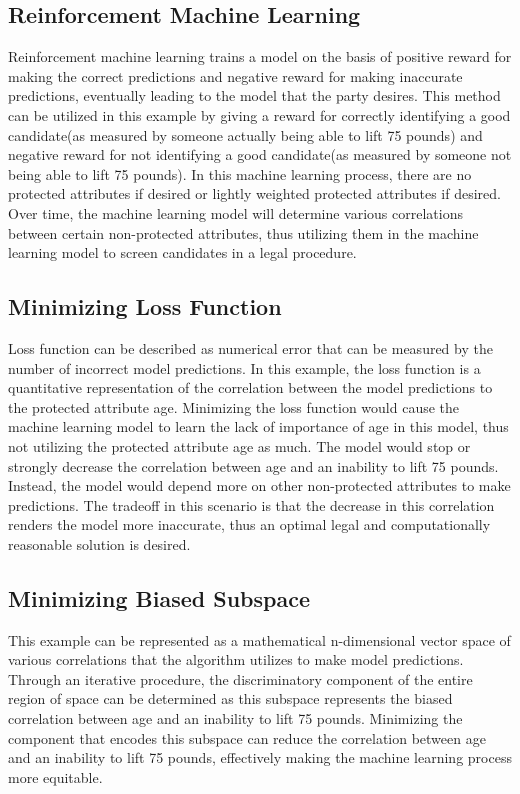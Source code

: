 \documentclass{article}
\begin{document}
\subsection{Reinforcement Machine Learning}

Reinforcement machine learning trains a model on the basis of positive reward for making the correct predictions and negative reward for making inaccurate predictions, eventually leading to the model that the party desires. This method can be utilized in this example by giving a reward for correctly identifying a good candidate(as measured by someone actually being able to lift 75 pounds) and negative reward for not identifying a good candidate(as measured by someone not being able to lift 75 pounds). In this machine learning process, there are no protected attributes if desired or lightly weighted protected attributes if desired. Over time, the machine learning model will determine various correlations between certain non-protected attributes, thus utilizing them in the machine learning model to screen candidates in a legal procedure. 

\subsection{Minimizing Loss Function}

Loss function can be described as numerical error that can be measured by the number of incorrect model predictions. In this example, the loss function is a quantitative representation of the correlation between the model predictions to the protected attribute age. Minimizing the loss function would cause the machine learning model to learn the lack of importance of age in this model, thus not utilizing the protected attribute age as much. The model would stop or strongly decrease the correlation between age and an inability to lift 75 pounds. Instead, the model would depend more on other non-protected attributes to make predictions. The tradeoff in this scenario is that the decrease in this correlation renders the model more inaccurate, thus an optimal legal and computationally reasonable solution is desired. 

\subsection{Minimizing Biased Subspace}

This example can be represented as a mathematical n-dimensional vector space of various correlations that the algorithm utilizes to make model predictions. Through an iterative procedure, the discriminatory component of the entire region of space can be determined as this subspace represents the biased correlation between age and an inability to lift 75 pounds. Minimizing the component that encodes this subspace can reduce the correlation between age and an inability to lift 75 pounds, effectively making the machine learning process more equitable. 
\end{document}
